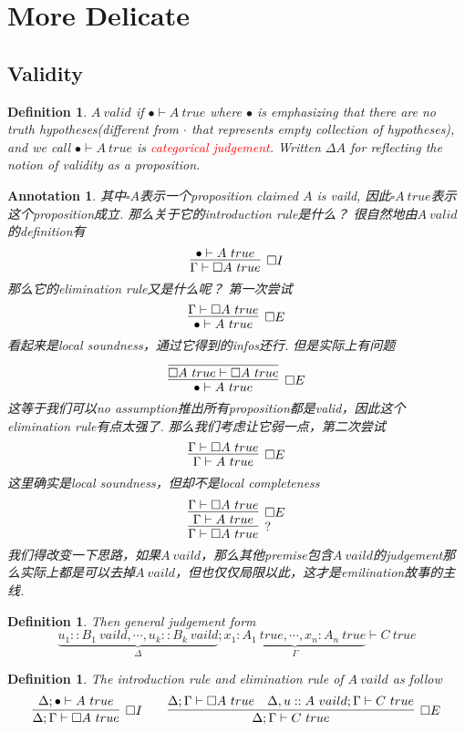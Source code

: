 \documentclass{article}
\theoremstyle{plain}
\newtheorem{definition}[theorem]{Definition}
\newtheorem{annotation}[theorem]{Annotation}
\theoremstyle{nonumberplain}
\newcommand{\redt}[1]{\textcolor{red}{#1}}
\begin{document}
\newpage
\section{More Delicate}

\subsection{Validity}

\begin{definition}
\rm $A~valid$ if $\bullet \vdash A~true$ where $\bullet$ is emphasizing that there are no truth hypotheses(different from $\cdot$ that represents empty collection of hypotheses), and we call $\bullet \vdash A~true$ is \redt{categorical judgement}. Written $\Delta A$ for reflecting the notion of validity as a proposition. 
\end{definition}

\begin{annotation}
\rm 其中$\square A$表示一个proposition claimed $A$ is vaild, 因此$\square A ~true$表示这个proposition成立. 那么关于它的introduction rule是什么？ 很自然地由$A ~ valid$的definition有
$$
\infer[\square I]{\Gamma \vdash \square A~true}{\bullet \vdash A~true}
$$
那么它的elimination rule又是什么呢？ 第一次尝试
$$
\infer[\square E]{\bullet \vdash A~true}{\Gamma \vdash \square A~true}
$$
看起来是local soundness，通过它得到的infos还行. 但是实际上有问题
$$
\infer[\square E]{\bullet \vdash A~true}{\infer{\square A~true \vdash \square A~true}{}}
$$
这等于我们可以no assumption推出所有proposition都是valid，因此这个elimination rule有点太强了. 那么我们考虑让它弱一点，第二次尝试
$$
\infer[\square E]{\Gamma \vdash A~true}{\Gamma \vdash \square A~true}
$$
这里确实是local soundness，但却不是local completeness
$$
\infer[?]{\Gamma \vdash \square A~true}{\infer[\square E]{\Gamma \vdash A~true}{\Gamma \vdash \square A~true}}
$$
我们得改变一下思路，如果$A~vaild$，那么其他premise包含$A~vaild$的judgement那么实际上都是可以去掉$A~vaild$，但也仅仅局限以此，这才是emilination故事的主线. 
\end{annotation}

\begin{definition}
\rm Then general judgement form
$$
\underbrace{u_1::B_1~vaild,\cdots,u_k::B_k~vaild}_{\Delta}; \underbrace{x_1:A_1~true,\cdots,x_n:A_n~true}_{\Gamma} \vdash C~true
$$
\end{definition}

\begin{definition}
\rm The introduction rule and elimination rule of $A~vaild$ as follow
$$
\begin{aligned}
\infer[\square I]{\Delta; \Gamma \vdash \square A~true}{\Delta; \bullet \vdash A~true} &&&& \infer[\square E]{\Delta;\Gamma \vdash C~true}{\Delta;\Gamma \vdash \square A~true & \Delta, u::A~vaild; \Gamma \vdash C~true}
\end{aligned}
$$
\end{definition}
\end{document}
